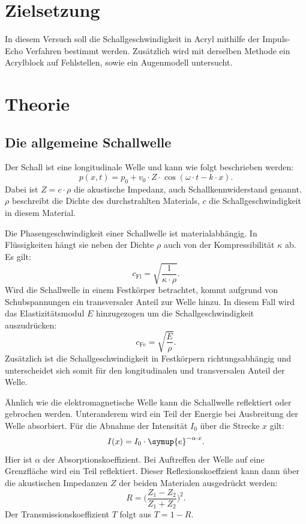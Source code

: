 \section{Zielsetzung}
\label{sec:Zielsetzung}
In diesem Versuch soll die Schallgeschwindigkeit in Acryl mithilfe der Impuls-Echo Verfahren bestimmt werden.
Zusätzlich wird mit derselben Methode ein Acrylblock auf Fehlstellen, sowie ein Augenmodell untersucht.

\section{Theorie}
\label{sec:Theorie}

\subsection{Die allgemeine Schallwelle}
\label{Schallwelle}

Der Schall ist eine longitudinale Welle und kann wie folgt beschrieben werden:
\begin{equation*}
    p(x, t) = p_0 + v_0 \cdot Z \cdot \cos(\omega \cdot t - k \cdot x).
\end{equation*}
Dabei ist $Z = c \cdot \rho$ die akustische Impedanz, auch Schallkennwiderstand genannt.
$\rho$ beschreibt die Dichte des durchstrahlten Materials, $c$ die Schallgeschwindigkeit in diesem Material.

\noindent
Die Phasengeschwindigkeit einer Schallwelle ist materialabhängig.
In Flüssigkeiten hängt sie neben der Dichte $\rho$ auch von der Kompressibilität $\kappa$ ab.
Es gilt:
\begin{equation*}
    c_\text{Fl} = \sqrt{\frac{1}{\kappa \cdot \rho}}.
\end{equation*}
Wird die Schallwelle in einem Festkörper betrachtet, kommt aufgrund von Schubspannungen ein transversaler Anteil zur Welle hinzu.
In diesem Fall wird das Elastizitätsmodul $E$ hinzugezogen um die Schallgeschwindigkeit auszudrücken:
\begin{equation*}
    c_\text{Fe} = \sqrt{\frac{E}{\rho}}.
\end{equation*}
Zusätzlich ist die Schallgeschwindigkeit in Festkörpern richtungsabhängig und unterscheidet sich somit für den longitudinalen
und transversalen Anteil der Welle.

\noindent
Ähnlich wie die elektromagnetische Welle kann die Schallwelle reflektiert oder gebrochen werden.
Unteranderem wird ein Teil der Energie bei Ausbreitung der Welle absorbiert.
Für die Abnahme der Intensität $I_0$ über die Strecke $x$ gilt:
\begin{equation} \label{eqn:absorptionkoeff}
    I(x) = I_0 \cdot \symup{e}^{-\alpha \cdot x}.
\end{equation}
Hier ist $\alpha$ der Absorptionskoeffizient.
Bei Auftreffen der Welle auf eine Grenzfläche wird ein Teil reflektiert.
Dieser Reflexionskoeffzient kann dann über die akustischen Impedanzen $Z$ der beiden Materialen ausgedrückt werden:
\begin{equation*}
    R = \biggl(\frac{Z_1 - Z_2}{Z_1 + Z_2}\biggr)^2.
\end{equation*}
Der Transmissionskoeffizient $T$ folgt aus $T = 1 - R$.

